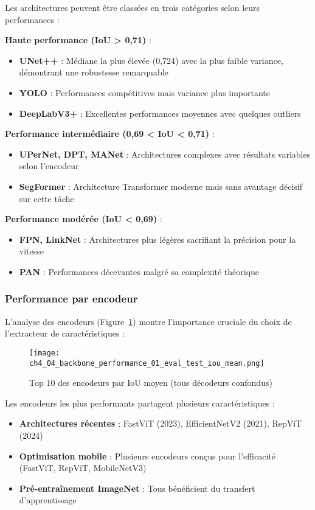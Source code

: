 Les architectures peuvent être classées en trois catégories selon leurs performances :

\textbf{Haute performance (IoU > 0,71)} :
\begin{itemize}
    \item \textbf{UNet++} : Médiane la plus élevée (0,724) avec la plus faible variance, démontrant une robustesse remarquable
    \item \textbf{YOLO} : Performances compétitives mais variance plus importante
    \item \textbf{DeepLabV3+} : Excellentes performances moyennes avec quelques outliers
\end{itemize}

\textbf{Performance intermédiaire (0,69 < IoU < 0,71)} :
\begin{itemize}
    \item \textbf{UPerNet, DPT, MANet} : Architectures complexes avec résultats variables selon l'encodeur
    \item \textbf{SegFormer} : Architecture Transformer moderne mais sans avantage décisif sur cette tâche
\end{itemize}

\textbf{Performance modérée (IoU < 0,69)} :
\begin{itemize}
    \item \textbf{FPN, LinkNet} : Architectures plus légères sacrifiant la précision pour la vitesse
    \item \textbf{PAN} : Performances décevantes malgré sa complexité théorique
\end{itemize}

\subsubsection{Performance par encodeur}

L'analyse des encodeurs (Figure~\ref{fig:top_encodeurs}) montre l'importance cruciale du choix de l'extracteur de caractéristiques :

\begin{figure}[htbp]
    \centering
    \texttt{[image: ch4\_04\_backbone\_performance\_01\_eval\_test\_iou\_mean.png]}
    \caption{Top 10 des encodeurs par IoU moyen (tous décodeurs confondus)}
    \label{fig:top_encodeurs}
\end{figure}

Les encodeurs les plus performants partagent plusieurs caractéristiques :
\begin{itemize}
    \item \textbf{Architectures récentes} : FastViT (2023), EfficientNetV2 (2021), RepViT (2024)
    \item \textbf{Optimisation mobile} : Plusieurs encodeurs conçus pour l'efficacité (FastViT, RepViT, MobileNetV3)
    \item \textbf{Pré-entraînement ImageNet} : Tous bénéficient du transfert d'apprentissage
\end{itemize}

